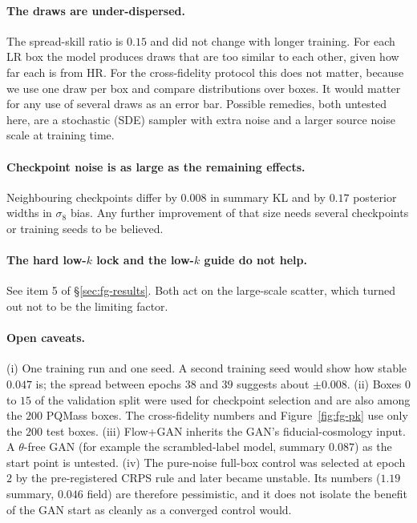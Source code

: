 \paragraph{The draws are under-dispersed.} The spread-skill ratio is $0.15$ and
did not change with longer training. For each LR box the model produces draws that
are too similar to each other, given how far each is from HR. For the
cross-fidelity protocol this does not matter, because we use one draw per box and
compare distributions over boxes. It would matter for any use of several draws as
an error bar. Possible remedies, both untested here, are a stochastic (SDE)
sampler with extra noise and a larger source noise scale at training time.

\paragraph{Checkpoint noise is as large as the remaining effects.} Neighbouring
checkpoints differ by $0.008$ in summary KL and by $0.17$ posterior widths in
$\sigma_8$ bias. Any further improvement of that size needs several checkpoints or
training seeds to be believed.

\paragraph{The hard low-$k$ lock and the low-$k$ guide do not help.} See item 5
of \S\ref{sec:fg-results}. Both act on the large-scale scatter, which turned out
not to be the limiting factor.

\paragraph{Open caveats.} (i) One training run and one seed. A second training
seed would show how stable $0.047$ is; the spread between epochs $38$ and $39$
suggests about $\pm0.008$. (ii) Boxes $0$ to $15$ of the validation split were used
for checkpoint selection and are also among the $200$ PQMass boxes. The
cross-fidelity numbers and Figure~\ref{fig:fg-pk} use only the $200$ test boxes.
(iii) Flow+GAN inherits the GAN's fiducial-cosmology input. A $\theta$-free GAN (for
example the scrambled-label model, summary $0.087$) as the start point is
untested. (iv) The pure-noise full-box control was selected at epoch $2$ by the
pre-registered CRPS rule and later became unstable. Its numbers ($1.19$ summary,
$0.046$ field) are therefore pessimistic, and it does not isolate the benefit of
the GAN start as cleanly as a converged control would.

